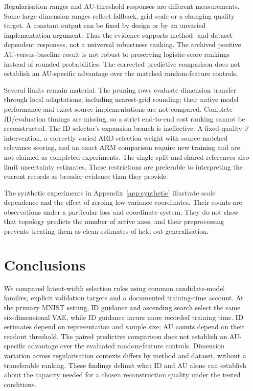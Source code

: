 \documentclass[make,article,submit,pdftex,moreauthors]{Definitions/mdpi}
\begin{document}
Regularisation ranges and AU-threshold responses are different
measurements. Some large dimension ranges reflect fallback, grid scale
or a changing quality target. A constant output can be fixed by design
or by an unvaried implementation argument. Thus the evidence supports
method- and dataset-dependent responses, not a universal robustness
ranking. The archived positive AU-versus-baseline result is not robust
to preserving logistic-score rankings instead of rounded probabilities.
The corrected predictive comparison does not establish an AU-specific
advantage over the matched random-feature controls.

Several limits remain material. The pruning rows evaluate dimension
transfer through local adaptations, including nearest-grid rounding;
their native model performance and exact-source implementations are not
compared. Complete ID/evaluation timings are missing, so a strict
end-to-end cost ranking cannot be reconstructed. The ID selector's
expansion branch is ineffective. A fixed-quality $\beta$ intervention,
a correctly varied ARD selection weight with source-matched relevance
scoring, and an exact ARM comparison require new training and are not
claimed as completed experiments. The single split and shared references
also limit uncertainty estimates. These restrictions are preferable to
interpreting the current records as broader evidence than they provide.

The synthetic experiments in Appendix~\ref{app:synthetic} illustrate
scale dependence and the effect of zeroing low-variance coordinates.
Their counts are observations under a particular loss and coordinate
system. They do not show that topology predicts the number of active
axes, and their preprocessing prevents treating them as clean estimates
of held-out generalisation.

\section{Conclusions}\label{sec:conclusion}
We compared latent-width selection rules using common candidate-model
families, explicit validation targets and a documented training-time
account. At the primary MNIST setting, ID guidance and ascending search
select the same six-dimensional VAE, while ID guidance incurs more
recorded training time. ID estimates depend on representation and sample
size; AU counts depend on their readout threshold. The paired predictive
comparison does not establish an AU-specific advantage over the evaluated
random-feature controls. Dimension variation across regularisation
contexts differs by method and dataset, without a transferable ranking.
These findings delimit what ID and AU alone can establish about the
capacity needed for a chosen reconstruction quality under the tested
conditions.
\end{document}
